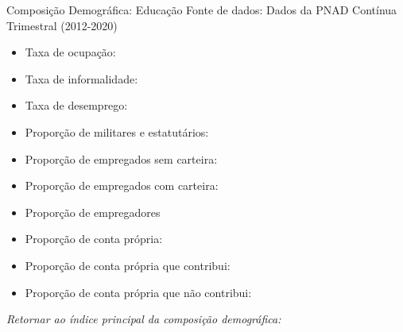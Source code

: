 \begin{frame}[label=_composicao_demografica_educacao]{Composição Demográfica: Educação}
{\footnotesize Fonte de dados: Dados da PNAD Contínua Trimestral (2012-2020)}
\begin{itemize}
\item{Taxa de ocupação: \hyperlink{_composicao_demografica_educacao_taxa_de_ocupacao}{}}
\item{Taxa de informalidade: \hyperlink{_composicao_demografica_educacao_taxa_de_informalidade}{}}
\item{Taxa de desemprego: \hyperlink{_composicao_demografica_educacao_taxa_de_desemprego}{}}
\item{Proporção de militares e estatutários: \hyperlink{_composicao_demografica_educacao_prop_militar}{}}
\item{Proporção de empregados sem carteira: \hyperlink{_composicao_demografica_educacao_prop_empregadoSC}{}}
\item{Proporção de empregados com carteira: \hyperlink{_composicao_demografica_educacao_prop_empregadoCC}{}}
\item{Proporção de empregadores \hyperlink{_composicao_demografica_educacao_prop_empregador}{}}
\item{Proporção de conta própria: \hyperlink{_composicao_demografica_educacao_prop_cpropria}{}}
\item{Proporção de conta própria que contribui: \hyperlink{_composicao_demografica_educacao_prop_cpropriaC}{}}
\item{Proporção de conta própria que não contribui: \hyperlink{_composicao_demografica_educacao_prop_cpropriaNc}{}}
\end{itemize}

\begin{small}
\textit{Retornar ao índice principal da composição demográfica: \hyperlink{_composicao_demografica}{} }
\end{small}

\end{frame}

